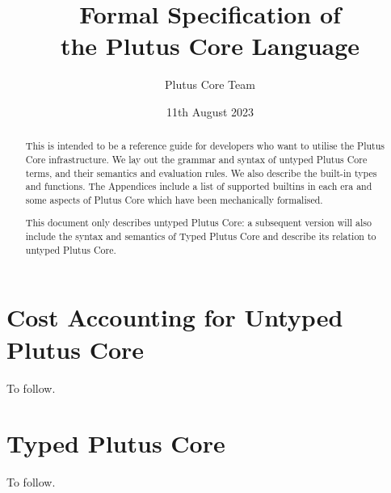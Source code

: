 \documentclass[a4paper]{article}
\title{Formal Specification of\\the Plutus Core Language}
\date{11th August 2023}
\author{Plutus Core Team}
\begin{document}
\maketitle

\begin{center}
  \LARGE{}
\end{center}

\begin{abstract}
  This is intended to be a reference guide for developers who want to utilise
  the Plutus Core infrastructure.  We lay out the grammar and syntax of untyped
  Plutus Core terms, and their semantics and evaluation rules.  We also describe
  the built-in types and functions.  The Appendices include a list of supported
  builtins in each era and some aspects of Plutus Core which have been
  mechanically formalised.
  
  This document only describes untyped Plutus Core: a subsequent version will also
  include the syntax and semantics of Typed Plutus Core and describe its relation to
  untyped Plutus Core.
\end{abstract}

\newpage
\tableofcontents
\newpage







\section{Cost Accounting for Untyped Plutus Core}
To follow.
\section{Typed Plutus Core}
To follow.

\begin{appendices}






\end{appendices}

\newpage


\newpage
\printnomenclature[2cm]  %
\end{document}
